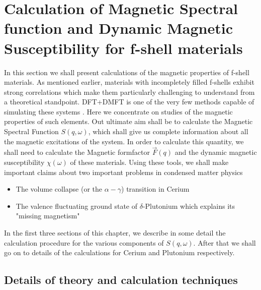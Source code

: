 \documentclass[10pt]{ruthesis}
\begin{document}
{\pagebreak
\chapter{Calculation of Magnetic Spectral function and Dynamic Magnetic Susceptibility for f-shell materials}

In this section we shall present calculations of the magnetic properties of f-shell materials. As mentioned earlier, materials with incompletely filled f-shells exhibit strong correlations which make them particularly challenging to understand from a theoretical standpoint. DFT+DMFT is one of the very few methods capable of simulating these systems \cite{Haule_Pu,Marianetti_Pu}. Here we concentrate on studies of the magnetic properties of such elements. Out ultimate aim shall be to calculate the Magnetic Spectral Function $S(q,\omega)$, which shall give us complete information about all the magnetic excitations of the system. In order to calculate this quantity, we shall need to calculate the Magnetic formfactor $\vec{F}(q)$ and the dynamic magnetic susceptibility $\chi(\omega)$ of these materials. Using these tools, we shall make important claims about two important problems in condensed matter physics
\begin{itemize}
\item The volume collapse (or the $\alpha - \gamma$) transition in Cerium
\item The valence fluctuating ground state of $\delta$-Plutonium which explains its "missing magnetism" 
\end{itemize}

In the first three sections of this chapter, we describe in some detail the calculation procedure for the various components of $S(q,\omega)$. After that we shall go on to details of the calculations for Cerium and Plutonium respectively.
\section{Details of theory and calculation techniques}
}
\end{document}
